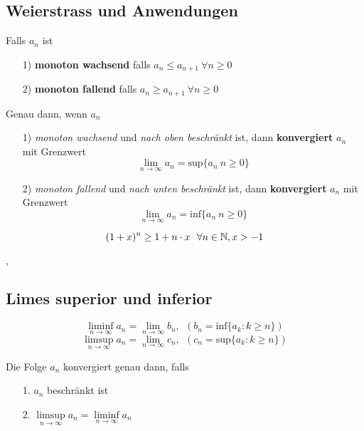 \subsection{Weierstrass und Anwendungen}

\Def[2.2.1] Falls  $a_{n}$ ist
\begin{enumerate}
\item[1)] \textbf{monoton wachsend}  falls ${a_{n} \leq a_{n + 1} \ \forall n \geq 0}$
\item[2)] \textbf{monoton fallend} falls ${a_{n} \geq a_{n + 1} \ \forall n \geq 0}$ \\
\end{enumerate}


\Satz[2.2.2 (Weierstrass)] Genau dann, wenn $a_{n}$ 
\begin{enumerate}
\item[1)] \textit{monoton wachsend} und \textit{nach oben beschränkt} ist, dann \textbf{konvergiert} $a_{n}$ mit Grenzwert
\[ 
\lim\limits_{n \rightarrow \infty} a_{n} = \text{sup}\{a_{n} \: n \geq 0\}
\]
\item[2)] \textit{monoton fallend} und \textit{nach unten beschränkt} ist, dann \textbf{konvergiert} $a_{n}$ mit Grenzwert
\[ 
\lim\limits_{n \rightarrow \infty} a_{n} = \text{inf}\{a_{n} \: n \geq 0\}
\]
\end{enumerate}

\[
(1 + x)^{n} \geq 1 + n \cdot x \ \ \forall n \in \N, x > -1
\] 

\sep

\subsection{Limes superior und inferior}

\Def[2.3.0]
\[
\liminf\limits_{n \rightarrow \infty} a_{n} = \lim\limits_{n \rightarrow \infty} b_{n}, \ \ (b_{n} = \text{inf} \{a_{k} : k \geq n \})
\]
\[
\limsup\limits_{n \rightarrow \infty} a_{n} = \lim\limits_{n \rightarrow \infty} c_{n}, \ \ (c_{n} = \text{sup} \{a_{k} : k \geq n \})
\]


\Lemma[2.4.1] Die Folge $a_{n}$ konvergiert genau dann, falls
\begin{enumerate}
\item[1.] $a_{n}$ beschränkt ist
\item[2.] $\limsup\limits_{n \rightarrow \infty} a_{n} = \liminf\limits_{n \rightarrow \infty} a_{n}$
\end{enumerate}

